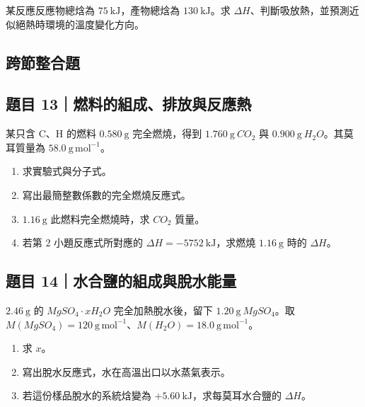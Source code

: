 \documentclass[11pt,a4paper]{article}
\providecommand{\tightlist}{%
  \setlength{\itemsep}{0pt}\setlength{\parskip}{0pt}}
\begin{document}
某反應反應物總焓為 \(75\ \mathrm{kJ}\)，產物總焓為 \(130\ \mathrm{kJ}\)。求 \(\Delta H\)、判斷吸放熱，並預測近似絕熱時環境的溫度變化方向。

\subsection{跨節整合題}\label{ux8de8ux7bc0ux6574ux5408ux984c}

\subsection{題目 13｜燃料的組成、排放與反應熱}\label{ux984cux76ee-13ux71c3ux6599ux7684ux7d44ux6210ux6392ux653eux8207ux53cdux61c9ux71b1}

某只含 C、H 的燃料 \(0.580\ \mathrm g\) 完全燃燒，得到 \(1.760\ \mathrm g\ CO_2\) 與 \(0.900\ \mathrm g\ H_2O\)。其莫耳質量為 \(58.0\ \mathrm{g\,mol^{-1}}\)。

\begin{enumerate}
\def\labelenumi{\arabic{enumi}.}
\tightlist
\item
  求實驗式與分子式。
\item
  寫出最簡整數係數的完全燃燒反應式。
\item
  \(1.16\ \mathrm g\) 此燃料完全燃燒時，求 \(CO_2\) 質量。
\item
  若第 2 小題反應式所對應的 \(\Delta H=-5752\ \mathrm{kJ}\)，求燃燒 \(1.16\ \mathrm g\) 時的 \(\Delta H\)。
\end{enumerate}

\subsection{題目 14｜水合鹽的組成與脫水能量}\label{ux984cux76ee-14ux6c34ux5408ux9e7dux7684ux7d44ux6210ux8207ux812bux6c34ux80fdux91cf}

\(2.46\ \mathrm g\) 的 \(MgSO_4\cdot xH_2O\) 完全加熱脫水後，留下 \(1.20\ \mathrm g\ MgSO_4\)。取 \(M(MgSO_4)=120\ \mathrm{g\,mol^{-1}}\)、\(M(H_2O)=18.0\ \mathrm{g\,mol^{-1}}\)。

\begin{enumerate}
\def\labelenumi{\arabic{enumi}.}
\tightlist
\item
  求 \(x\)。
\item
  寫出脫水反應式，水在高溫出口以水蒸氣表示。
\item
  若這份樣品脫水的系統焓變為 \(+5.60\ \mathrm{kJ}\)，求每莫耳水合鹽的 \(\Delta H\)。
\end{enumerate}
\end{document}
